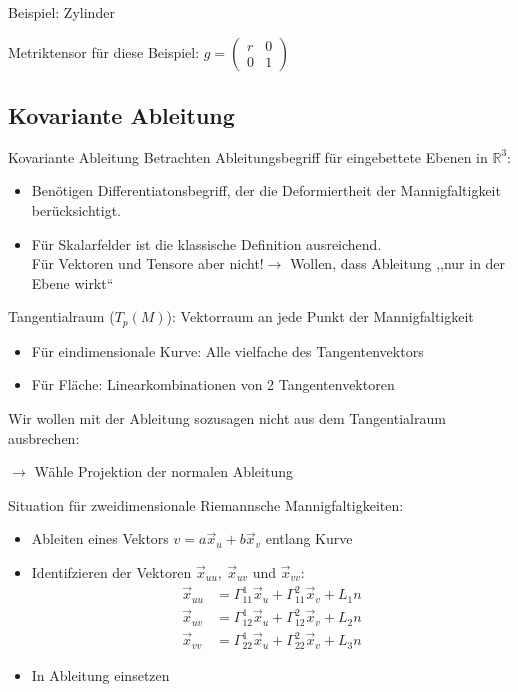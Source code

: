 \documentclass[mathserif]{beamer}
\newcommand{\vx}{\vec{x}}
\theoremstyle{definition}
\begin{document}
	\begin{frame}
		Beispiel: Zylinder\\
		\begin{center}
			
		\end{center}
		Metriktensor f\"ur diese Beispiel: $g=\left(\begin{array}{cc} r & 0 \\ 0 & 1 \end{array}\right)$
	\end{frame}
\subsection{Kovariante Ableitung}
	\begin{frame}{Kovariante Ableitung}
		Betrachten Ableitungsbegriff für eingebettete Ebenen in $\mathbb{R}^3$:
		\begin{itemize}
		\item Benötigen Differentiatonsbegriff, der die Deformiertheit der Mannigfaltigkeit berücksichtigt.\\
		\pause
		\item Für Skalarfelder ist die klassische Definition ausreichend.\\
		Für Vektoren und Tensore aber nicht!$\rightarrow$ Wollen, dass Ableitung ,,nur in der Ebene wirkt``\\
		\pause
		\end{itemize}
	\end{frame}
	\begin{frame}
		Tangentialraum ($T_p(M)$): Vektorraum an jede Punkt der Mannigfaltigkeit
		\begin{itemize}
			\item Für eindimensionale Kurve: Alle vielfache des Tangentenvektors
			\item Für Fläche: Linearkombinationen von 2 Tangentenvektoren
		\end{itemize}
		\pause
		Wir wollen mit der Ableitung sozusagen nicht aus dem Tangentialraum ausbrechen:
		\begin{center}
		$\rightarrow$ Wähle Projektion der normalen Ableitung
		\end{center}
	\end{frame}
	\begin{frame}
		Situation für zweidimensionale Riemannsche Mannigfaltigkeiten:
		\begin{itemize}
			\item Ableiten eines Vektors $v=a \vx_u+b\vx_v$ entlang Kurve
			\pause
			\item Identifzieren der Vektoren $\vx_{uu},\ \vx_{uv}$ und $\vx_{vv}$:
				\begin{align*}
					\vec{x}_{uu}&=\Gamma^1_{11} \vx_u+\Gamma^2_{11}\vx_v+L_1 n\\
					\vx_{uv}&=\Gamma^1_{12}\vx_u+\Gamma^2_{12}\vx_v +L_2 n\\
					\vx_{vv}&=\Gamma^1_{22}\vx_u+\Gamma^2_{22}\vx_v+L_3 n
				\end{align*}
			\pause
			\item In Ableitung einsetzen
		\end{itemize}
	\end{frame}
	
\end{document}
